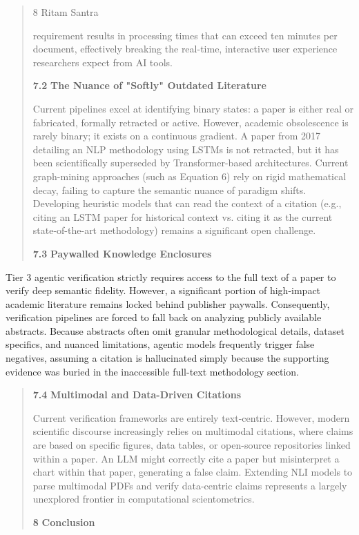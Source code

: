 \documentclass[
]{article}
\begin{document}
\begin{quote}
8 Ritam Santra

requirement results in processing times that can exceed ten minutes per
document, effectively breaking the real-time, interactive user
experience researchers expect from AI tools.

\textbf{7.2} \textbf{The Nuance of "Softly" Outdated Literature}

Current pipelines excel at identifying binary states: a paper is either
real or fabricated, formally retracted or active. However, academic
obsolescence is rarely binary; it exists on a continuous gradient. A
paper from 2017 detailing an NLP methodology using LSTMs is not
retracted, but it has been scientifically superseded by
Transformer-based architectures. Current graph-mining approaches (such
as Equation 6) rely on rigid mathematical decay, failing to capture the
semantic nuance of paradigm shifts. Developing heuristic models that can
read the context of a citation (e.g., citing an LSTM paper for
historical context vs. citing it as the current state-of-the-art
methodology) remains a significant open challenge.

\textbf{7.3} \textbf{Paywalled Knowledge Enclosures}
\end{quote}

Tier 3 agentic verification strictly requires access to the full text of
a paper to verify deep semantic fidelity. However, a significant portion
of high-impact academic literature remains locked behind publisher
paywalls. Consequently, verification pipelines are forced to fall back
on analyzing publicly available abstracts. Because abstracts often omit
granular methodological details, dataset specifics, and nuanced
limitations, agentic models frequently trigger false negatives, assuming
a citation is hallucinated simply because the supporting evidence was
buried in the inaccessible full-text methodology section.

\begin{quote}
\textbf{7.4} \textbf{Multimodal and Data-Driven Citations}

Current verification frameworks are entirely text-centric. However,
modern scientific discourse increasingly relies on multimodal citations,
where claims are based on specific figures, data tables, or open-source
repositories linked within a paper. An LLM might correctly cite a paper
but misinterpret a chart within that paper, generating a false claim.
Extending NLI models to parse multimodal PDFs and verify data-centric
claims represents a largely unexplored frontier in computational
scientometrics.

\textbf{8} \textbf{Conclusion}
\end{quote}
\end{document}
